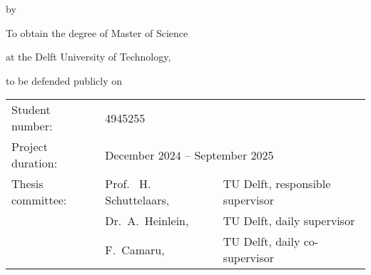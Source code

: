 \begin{titlepage}

    \begin{center}

        {\makeatletter
            \largecoverstyle\fontsize{45}{45}\selectfont\@title
            \makeatother}

        {\makeatletter
            \ifdefvoid{\@subtitle}{}{\bigskip\coverstyle\fontsize{20}{20}\selectfont\@subtitle}
            \makeatother}

        \bigskip
        \bigskip

        by

        \bigskip
        \bigskip

        {\makeatletter
            \coverstyle\fontsize{25}{25}\selectfont\@author
            \makeatother}

        \bigskip
        \bigskip

        To obtain the degree of Master of Science

        at the Delft University of Technology,


        to be defended publicly on {\makeatletter
                \makeatother}

        \vfill

        \begin{tabular}{lll}
            Student number:   & 4945255                                                                                \\
            Project duration: & \multicolumn{2}{l}{December 2024 -- September 2025}                                    \\
            Thesis committee: & Prof. \ H. Schuttelaars,                            & TU Delft, responsible supervisor \\
                              & Dr.\ A.\ Heinlein,                                  & TU Delft, daily supervisor       \\
                              & F.\ Camaru,                                         & TU Delft, daily co-supervisor    \\
        \end{tabular}


\end{center}
\end{titlepage}
